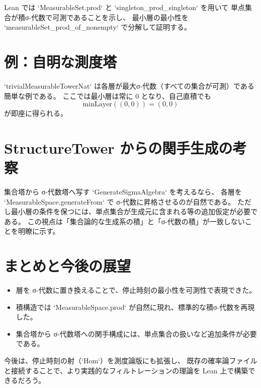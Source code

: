 \documentclass[a4paper,11pt]{ltjsarticle}
\begin{document}
Lean では `MeasurableSet.prod` と `singleton_prod_singleton` を用いて
単点集合が積σ-代数で可測であることを示し、
最小層の最小性を `measurableSet_prod_of_nonempty` で分解して証明する。

\section{例：自明な測度塔}

`trivialMeasurableTowerNat` は各層が最大σ-代数（すべての集合が可測）である簡単な例である。
ここでは最小層は常に 0 となり、自己直積でも
\[
  \mathrm{minLayer}((0,0)) = (0,0)
\]
が即座に得られる。

\section{StructureTower からの関手生成の考察}

集合塔から σ-代数塔へ写す `GenerateSigmaAlgebra` を考えるなら、
各層を `MeasurableSpace.generateFrom` で σ-代数に昇格させるのが自然である。
ただし最小層の条件を保つには、単点集合が生成元に含まれる等の追加仮定が必要である。
この視点は「集合論的な生成系の積」と「σ-代数の積」が一致しないことを明瞭に示す。

\section{まとめと今後の展望}

\begin{itemize}
  \item 層を σ-代数に置き換えることで、停止時刻の最小性を可測性で表現できた。
  \item 積構造では `MeasurableSpace.prod` が自然に現れ、標準的な積σ-代数を再現した。
  \item 集合塔から σ-代数塔への関手構成には、単点集合の扱いなど追加条件が必要である。
\end{itemize}

今後は、停止時刻の射（`Hom`）を測度論版にも拡張し、
既存の確率論ファイルと接続することで、より実践的なフィルトレーションの理論を
Lean 上で構築できるだろう。
\end{document}
